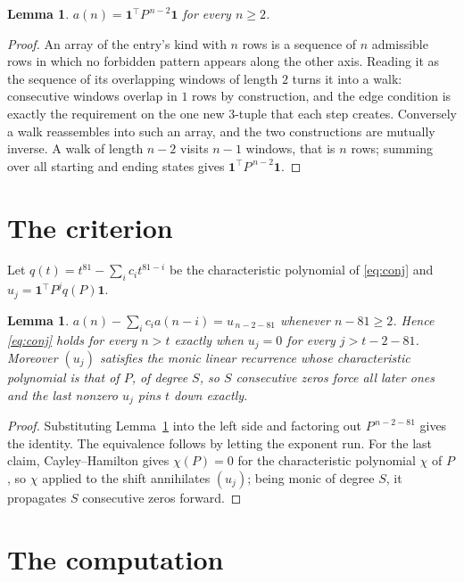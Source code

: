\documentclass[11pt,a4paper]{article}
\theoremstyle{plain}
\newtheorem{lemma}[theorem]{Lemma}
\theoremstyle{definition}
\begin{document}
\begin{lemma}\label{lem:walk}
$a(n)=\mathbf{1}^{\!\top}P^{\,n-2}\mathbf{1}$ for every $n\ge2$.
\end{lemma}

\begin{proof}
An array of the entry's kind with $n$ rows is a sequence of $n$ admissible rows in
which no forbidden pattern appears along the other axis. Reading it as the sequence of its
overlapping windows of length $2$ turns it into a walk: consecutive windows overlap in
$1$ rows by construction, and the edge condition is exactly the requirement on the one
new $3$-tuple that each step creates. Conversely a walk reassembles into such an array,
and the two constructions are mutually inverse. A walk of length $n-2$ visits $n-1$
windows, that is $n$ rows; summing over all starting and ending states gives
$\mathbf{1}^{\!\top}P^{\,n-2}\mathbf{1}$.
\end{proof}

\section{The criterion}

Let $q(t)=t^{81}-\sum_i c_i t^{81-i}$ be the characteristic polynomial of
\eqref{eq:conj} and $u_j=\mathbf{1}^{\!\top}P^{j}q(P)\mathbf{1}$.

\begin{lemma}\label{lem:crit}
$a(n)-\sum_i c_i a(n-i)=u_{\,n-2-81}$ whenever $n-81\ge2$. Hence
\eqref{eq:conj} holds for every $n>t$ exactly when $u_j=0$ for every
$j>t-2-81$. Moreover $(u_j)$ satisfies the monic linear recurrence whose
characteristic polynomial is that of $P$, of degree $S$, so $S$ consecutive zeros force all
later ones and the last nonzero $u_j$ pins $t$ down exactly.
\end{lemma}

\begin{proof}
Substituting Lemma~\ref{lem:walk} into the left side and factoring out
$P^{\,n-2-81}$ gives the identity. The equivalence follows by letting the exponent
run. For the last claim, Cayley--Hamilton gives $\chi(P)=0$ for the characteristic
polynomial $\chi$ of $P$, so $\chi$ applied to the shift annihilates $(u_j)$; being monic of
degree $S$, it propagates $S$ consecutive zeros forward.
\end{proof}

\section{The computation}
\end{document}
